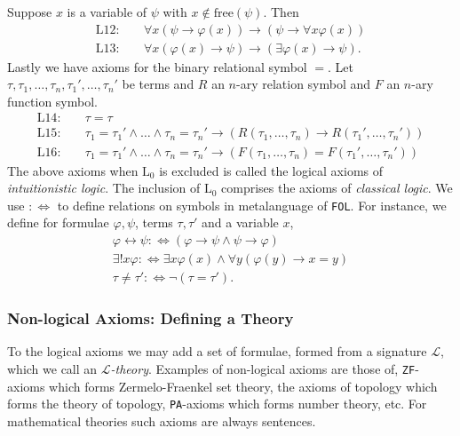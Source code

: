 Suppose $x$ is a variable of $\psi$ with $x\notin\mathrm{free}(\psi)$. Then 
\begin{align*}
    \mathrm{L12}\colon \quad & \forall x(\psi\to \varphi(x))\to (\psi\to \forall x\varphi(x))\\
    \mathrm{L13}\colon \quad & \forall x(\varphi(x)\to \psi)\to (\exists\varphi(x)\to \psi).
\end{align*} 
Lastly we have axioms for the binary relational symbol $=$. Let $\tau,\tau_1,\dots,\tau_n,\tau_1',\dots,\tau_n'$ be terms and $R$ an $n$-ary relation symbol and $F$ an $n$-ary function symbol.
\begin{align*}
    \mathrm{L14}\colon \quad & \tau = \tau\\
    \mathrm{L15}\colon \quad & \tau_1 = \tau_1' \wedge \dots \wedge \tau_n = \tau_n' \to (R(\tau_1,\dots,\tau_n)\to R(\tau_1',\dots,\tau_n'))\\
    \mathrm{L16}\colon \quad & \tau_1 = \tau_1' \wedge \dots \wedge \tau_n = \tau_n' \to (F(\tau_1,\dots,\tau_n)= F(\tau_1',\dots,\tau_n'))  
\end{align*}
The above axioms when $\mathrm{L}_0$ is excluded is called the logical axioms of \emph{intuitionistic logic}. The inclusion of $\mathrm{L}_0$ comprises the axioms of \emph{classical logic}.
We use $:\iff$ to define relations on symbols in metalanguage of \verb|FOL|. For instance, we define for formulae $\varphi,\psi$, terms $\tau,\tau'$ and a variable $x$, 
\begin{gather*}
    \varphi \leftrightarrow \psi :\iff (\varphi \to \psi \wedge \psi \to \varphi)\\
    \exists! x\varphi :\iff \exists x\varphi(x) \wedge \forall y(\varphi(y)\to x=y)\\
    \tau \neq \tau' :\iff \neg(\tau = \tau').
\end{gather*}

\subsubsection{Non-logical Axioms: Defining a Theory}
To the logical axioms we may add a set of formulae, formed from a signature $\mathcal{L}$, which we call an \emph{$\mathcal{L}$-theory}. Examples of non-logical axioms are those of, \verb|ZF|-axioms which forms Zermelo-Fraenkel set theory, the axioms of topology which forms the theory of topology, \verb|PA|-axioms which forms number theory, etc. For mathematical theories such axioms are always sentences.  
